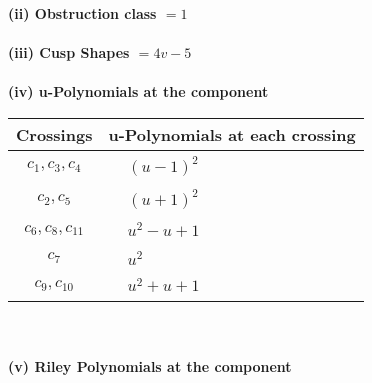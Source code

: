 \documentclass[1p]{elsarticle_modified}
\theoremstyle{definition}
\begin{document}
\flushleft \textbf{(ii) Obstruction class $= 1$}\\~\\
\flushleft \textbf{(iii) Cusp Shapes $= 4 v-5$}\\~\\
\newpage\renewcommand{\arraystretch}{1}
\flushleft \textbf{(iv) u-Polynomials at the component}\newline \\
\begin{tabular}{m{50pt}|m{274pt}}
Crossings & \hspace{64pt}u-Polynomials at each crossing \\
\hline $$\begin{aligned}c_{1},c_{3},c_{4}\end{aligned}$$&$\begin{aligned}
&(u-1)^2
\end{aligned}$\\
\hline $$\begin{aligned}c_{2},c_{5}\end{aligned}$$&$\begin{aligned}
&(u+1)^2
\end{aligned}$\\
\hline $$\begin{aligned}c_{6},c_{8},c_{11}\end{aligned}$$&$\begin{aligned}
&u^2- u+1
\end{aligned}$\\
\hline $$\begin{aligned}c_{7}\end{aligned}$$&$\begin{aligned}
&u^2
\end{aligned}$\\
\hline $$\begin{aligned}c_{9},c_{10}\end{aligned}$$&$\begin{aligned}
&u^2+u+1
\end{aligned}$\\
\hline
\end{tabular}\\~\\
\newpage\renewcommand{\arraystretch}{1}
\flushleft \textbf{(v) Riley Polynomials at the component}\newline \\
\end{document}
